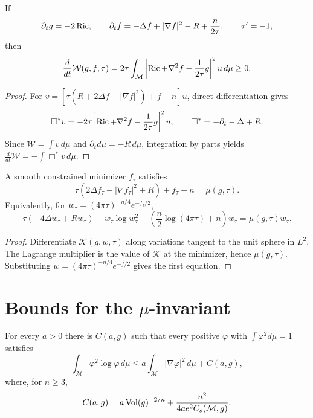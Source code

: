 \begin{theorem}
\label{thm:chow-iii-ch17-entropy-monotonicity}
If
\[
 \partial_tg=-2\operatorname{Ric},\qquad
 \partial_tf=-\Delta f+|\nabla f|^2-R+\frac n{2\tau},
 \qquad \tau'=-1,
\]
then
\[
 \frac d{dt}\mathcal W(g,f,\tau)=2\tau\int_{\mathcal M}
 \left|\Ric+\nabla^2f-\frac1{2\tau}g\right|^2u\,d\mu\ge0.
\]
\end{theorem}
\begin{proof}
For
$v=[\tau(R+2\Delta f-|\nabla f|^2)+f-n]u$, direct differentiation gives
\[
 \Box^*v=-2\tau\left|\operatorname{Ric}+\nabla^2f-\frac1{2\tau}g\right|^2u,
 \qquad \Box^*=-\partial_t-\Delta+R.
\]
Since $\mathcal W=\int v\,d\mu$ and $\partial_td\mu=-R\,d\mu$,
integration by parts yields $\frac d{dt}\mathcal W=-\int\Box^*v\,d\mu$.
\end{proof}

\begin{lemma}
\label{lem:chow-iii-ch17-entropy-minimizer-equation}
A smooth constrained minimizer $f_\tau$ satisfies
\[
 \tau(2\Delta f_\tau-|\nabla f_\tau|^2+R)+f_\tau-n=\mu(g,\tau).
\]
Equivalently, for $w_\tau=(4\pi\tau)^{-n/4}e^{-f_\tau/2}$,
\[
 \tau(-4\Delta w_\tau+Rw_\tau)-w_\tau\log w_\tau^2
 -\left(\frac n2\log(4\pi\tau)+n\right)w_\tau
 =\mu(g,\tau)w_\tau.
\]
\end{lemma}
\begin{proof}
Differentiate $\mathcal K(g,w,\tau)$ along variations tangent to the unit
sphere in $L^2$.  The Lagrange multiplier is the value of $\mathcal K$ at
the minimizer, hence $\mu(g,\tau)$.  Substituting
$w=(4\pi\tau)^{-n/4}e^{-f/2}$ gives the first equation.
\end{proof}

\section{Bounds for the \texorpdfstring{$\mu$}{mu}-invariant}

\begin{lemma}
\label{lem:chow-iii-ch17-logarithmic-sobolev}
For every $a>0$ there is $C(a,g)$ such that every positive $\varphi$ with
$\int\varphi^2d\mu=1$ satisfies
\[
 \int_{\mathcal M}\varphi^2\log\varphi\,d\mu
 \le a\int_{\mathcal M}|\nabla\varphi|^2\,d\mu+C(a,g),
\]
where, for $n\ge3$,
\[
 C(a,g)=a\Vol(g)^{-2/n}+\frac{n^2}{4ae^2C_s(\mathcal M,g)}.
\]
\end{lemma}

